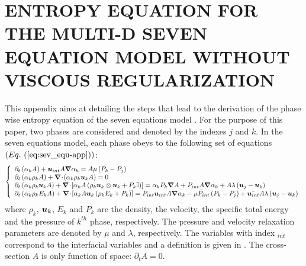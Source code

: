 %
%
%


\chapter{\uppercase{Entropy equation for the multi-D seven equation model without viscous regularization}\label{app:sev-equ-model-entropy}}
This appendix aims at detailing the steps that lead to the derivation of the phase wise entropy equation of the seven equations model \cite{SEM}. For the purpose of this paper, two phases are considered and denoted by the indexes $j$ and $k$. In the seven equations model, each phase obeys to the following set of equations $(\eqt{eq:sev_equ-app})$:
\begin{equation}
\label{eq:sev_equ-app}
\left\{
\begin{array}{llll}
\partial_t \left( \alpha_k  A\right) + \boldsymbol u_{int} A \boldsymbol{\nabla} \alpha_k = A \mu \left( P_k - P_j \right)\\
\partial_t \left( \alpha_k \rho_k A \right) + \boldsymbol{\nabla}\! \cdot \! \left( \alpha_k \rho_k \boldsymbol u_k A \right) = 0 \\
\partial_t \left( \alpha_k \rho_k \boldsymbol u_k A \right) + \boldsymbol{\nabla}\! \cdot \! \left[ \alpha_k A \left( \rho_k \boldsymbol u_k \otimes \boldsymbol u_k + P_k \mathbb{I} \right) \right] = \alpha_k P_k \boldsymbol{\nabla} A + P_{int} A \boldsymbol{\nabla} \alpha_k + A \lambda \left( \boldsymbol u_j - \boldsymbol u_k \right) \\
\partial_t \left( \alpha_k \rho_k E_k A \right) + \boldsymbol{\nabla}\! \cdot \! \left[ \alpha_k A \boldsymbol u_k \left( \rho_k E_k + P_k \right) \right] = P_{int} \boldsymbol u_{int} A \boldsymbol{\nabla} \alpha_k - \mu \bar{P}_{int} \left( P_k-P_j \right) + \bar{\boldsymbol u_{int}}A \lambda \left( \boldsymbol u_j - \boldsymbol u_k \right)
\end{array}
\right.
\end{equation}
where $\rho_k$, $\boldsymbol u_k$, $E_k$ and $P_k$ are the density, the velocity, the specific total energy and the pressure of $k^{th}$ phase, respectively. The pressure and velocity relaxation parameters are denoted by $\mu$ and $\lambda$, respectively. The variables with index $_{int}$ correspond to the interfacial variables and a definition is given in . The cross-section $A$ is only function of space: $\partial_t A = 0$. 

